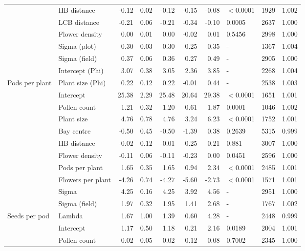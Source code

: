 \begin{longtable}{l|l|r|r|r|r|r|l|r|r}
 & HB distance & -0.12 & 0.02 & -0.12 & -0.15 & -0.08 & $<$0.0001 & 1929 & 1.002\\
\cline{2-10}
 & LCB distance & -0.21 & 0.06 & -0.21 & -0.34 & -0.10 & 0.0005 & 2637 & 1.000\\
\cline{2-10}
 & Flower density & 0.00 & 0.01 & 0.00 & -0.02 & 0.01 & 0.5456 & 2998 & 1.000\\
\cline{2-10}
 & Sigma (plot) & 0.30 & 0.03 & 0.30 & 0.25 & 0.35 & - & 1367 & 1.004\\
\cline{2-10}
 & Sigma (field) & 0.37 & 0.06 & 0.36 & 0.27 & 0.49 & - & 2905 & 1.000\\
\cline{2-10}
 & Intercept (Phi) & 3.07 & 0.38 & 3.05 & 2.36 & 3.85 & - & 2268 & 1.004\\
\cline{2-10}
\multirow{-11}{*}{\raggedright\arraybackslash Pods per plant} & Plant size (Phi) & 0.22 & 0.12 & 0.22 & -0.01 & 0.44 & - & 2538 & 1.003\\
\cline{1-10}
 & Intercept & 25.38 & 2.29 & 25.48 & 20.64 & 29.38 & $<$0.0001 & 1651 & 1.001\\
\cline{2-10}
 & Pollen count & 1.21 & 0.32 & 1.20 & 0.61 & 1.87 & 0.0001 & 1046 & 1.002\\
\cline{2-10}
 & Plant size & 4.76 & 0.78 & 4.76 & 3.24 & 6.23 & $<$0.0001 & 1752 & 1.001\\
\cline{2-10}
 & Bay centre & -0.50 & 0.45 & -0.50 & -1.39 & 0.38 & 0.2639 & 5315 & 0.999\\
\cline{2-10}
 & HB distance & -0.02 & 0.12 & -0.01 & -0.25 & 0.21 & 0.881 & 3007 & 1.000\\
\cline{2-10}
 & Flower density & -0.11 & 0.06 & -0.11 & -0.23 & 0.00 & 0.0451 & 2596 & 1.000\\
\cline{2-10}
 & Pods per plant & 1.65 & 0.35 & 1.65 & 0.94 & 2.34 & $<$0.0001 & 2485 & 1.001\\
\cline{2-10}
 & Flowers per plant & -4.26 & 0.74 & -4.27 & -5.60 & -2.73 & $<$0.0001 & 1571 & 1.001\\
\cline{2-10}
 & Sigma & 4.25 & 0.16 & 4.25 & 3.92 & 4.56 & - & 2951 & 1.000\\
\cline{2-10}
 & Sigma (field) & 1.97 & 0.32 & 1.95 & 1.41 & 2.68 & - & 1767 & 1.002\\
\cline{2-10}
\multirow{-11}{*}{\raggedright\arraybackslash Seeds per pod} & Lambda & 1.67 & 1.00 & 1.39 & 0.60 & 4.28 & - & 2448 & 0.999\\
\cline{1-10}
 & Intercept & 1.17 & 0.50 & 1.18 & 0.21 & 2.16 & 0.0189 & 2004 & 1.001\\
\cline{2-10}
 & Pollen count & -0.02 & 0.05 & -0.02 & -0.12 & 0.08 & 0.7002 & 2345 & 1.000\\

\end{longtable}
